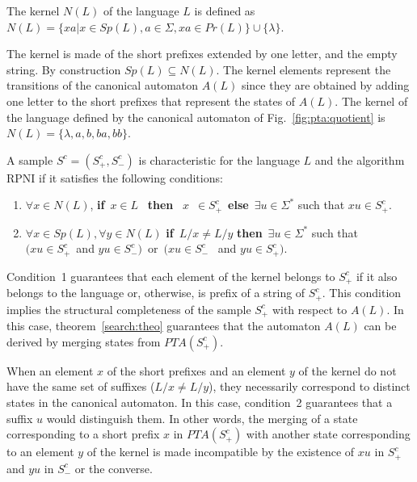 \begin{definition}
 The kernel $N(L)$ of the language $L$ is defined as $N(L) = \{xa | x \in Sp(L), a \in \Sigma, xa \in Pr(L)\} \cup \{\lambda\}$.
\end{definition}

The kernel is made of the short prefixes extended by one letter, and the empty string. By construction $Sp(L) \subseteq N(L)$. The kernel elements represent the transitions of the canonical automaton $A(L)$ since they are obtained by adding one letter to the short prefixes that represent the states of $A(L)$. The kernel of the language defined by the canonical automaton of Fig.~\ref{fig:pta:quotient} is $N(L) = \{\lambda, a, b, ba, bb\}$.

\begin{definition}
A sample $S^c=(S_{+}^c,S_{-}^c)$ is characteristic for
the language $L$ and the algorithm RPNI if it satisfies the
following conditions: 
\begin{enumerate}
\item  $\forall x\in N(L)$, \textbf{if}\ $x\in L$ \ \textbf{then
}\ $x$\ $\in S_{+}^c$\ \textbf{else}\ $\exists u\in \Sigma ^{*}$ such that $xu\in S_{+}^c$.

\item  $\forall x\in Sp(L),\forall y\in N(L)$ \textbf{if}\ $L/x\neq
L/y$ \textbf{then}\ $\exists u\in \Sigma ^{*}$ such that \\$(xu\in S_{+}^c$\ and $yu\in S_{-}^c)$\ or\ $(xu\in S_{-}^c$
\ and $yu\in S_{+}^c)$.
\end{enumerate}
\label{Characteristic:Sample}
\end{definition}

Condition~1 guarantees that each element of the kernel belongs to $S_{+}^c$ if it also belongs to the language or, otherwise, is prefix of a string of $S_{+}^c$. This condition implies the structural completeness of the sample $S_{+}^c$ with respect to $A(L)$. In this case, theorem~\ref{search:theo} guarantees that the automaton $A(L)$ can be derived by merging states from $PTA(S_{+}^c)$. 

When an element $x$ of the short prefixes and an element $y$ of the kernel do not have the same set of suffixes ($L/x\neq L/y$), they necessarily correspond to distinct states in the canonical automaton. In this case, condition~2 guarantees that a suffix $u$ would distinguish them. In other words, the merging of a state corresponding to a short prefix $x$ in $PTA(S_{+}^c)$ with another state corresponding to an element $y$ of the kernel is made incompatible by the existence of $xu$ in $S_{+}^c$ and $yu $ in $S_{-}^c$ or the converse.

